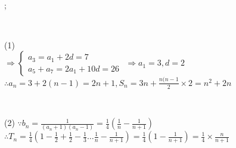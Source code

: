 
\immediate{}
\immediate{}
%
\newcommand{\fTxT}[1]{\text{\zh{#1}}}
%
\begin{minipage}[b][14cm][t]{\textwidth}
\begin{center}\large{}\end{center}
\color{black}\begin{large}
\\
;\\
\end{large}\\[10pt]
\begin{large}(1)
\\
$\Longrightarrow \begin{cases}
  a_3=a_1+2d=7 \\
  a_5+a_7=2a_1+10d=26
\end{cases}$ $\Rightarrow a_1=3,d=2$\\
$\therefore a_n=3+2(n-1)=2n+1,S_n=3n+\frac{n(n-1}{2} \times 2=n^2+2n$
\end{large}\\[10pt]
\begin{large}(2)
  $\because b_n=\frac{1}{(a_n+1)(a_n-1)}=\frac{1}{4}(\frac{1}{n}-\frac{1}{n+1})$\\
  $\therefore T_n=\frac{1}{4}(1-\frac{1}{2}+\frac{1}{2}-\frac{1}{3} \dots \frac{1}{n}-\frac{1}{n+1})=\frac{1}{4}(1-\frac{1}{n+1})=\frac{1}{4} \times \frac{n}{n+1}$
\end{large}
\end{minipage}
